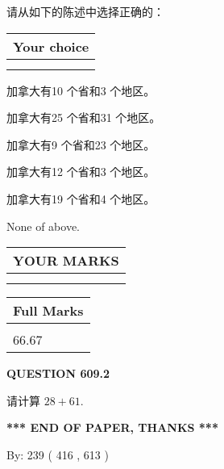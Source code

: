 \documentclass{ctexart}
\begin{document}
  
请从如下的陈述中选择正确的：
  
  
\noindent\hspace{3.0in} \begin{tabular}{|l|}
\hline
Your choice \\
\hline
 \\ 
 \\ 
\hline
\end{tabular}
  
  
 
 
加拿大有10 个省和3 个地区。
 
 
加拿大有25 个省和31 个地区。
 
 
加拿大有9 个省和23 个地区。
 
 
加拿大有12 个省和3 个地区。
 
 
加拿大有19 个省和4 个地区。
 
 
 None of above.
 
 
  
\vspace{0.2in}
  
\noindent\begin{tabular}{|l|}
\hline
 YOUR MARKS  \\
\hline
 \\ 
 \\ 
\hline
\end{tabular}
\hspace{0.05in} \begin{tabular}{|l|}
\hline
 Full Marks  \\
\hline
 \\ 
66.67 \\
\hline
\end{tabular}
{\textbf{\Large{QUESTION
609.2 
}}}
  
  
 
请计算 $ %
28 +  %
61 $.
 

 

 
   
   
 \vspace{0.2in}
 
   
   
   
   
\vspace{1.0in} 
{\textbf{\large{ *** END OF PAPER, THANKS *** }}} 
   
   
\hspace{1.0in} By: 
 239 ( 416 ,  613 )
   
\end{document}
